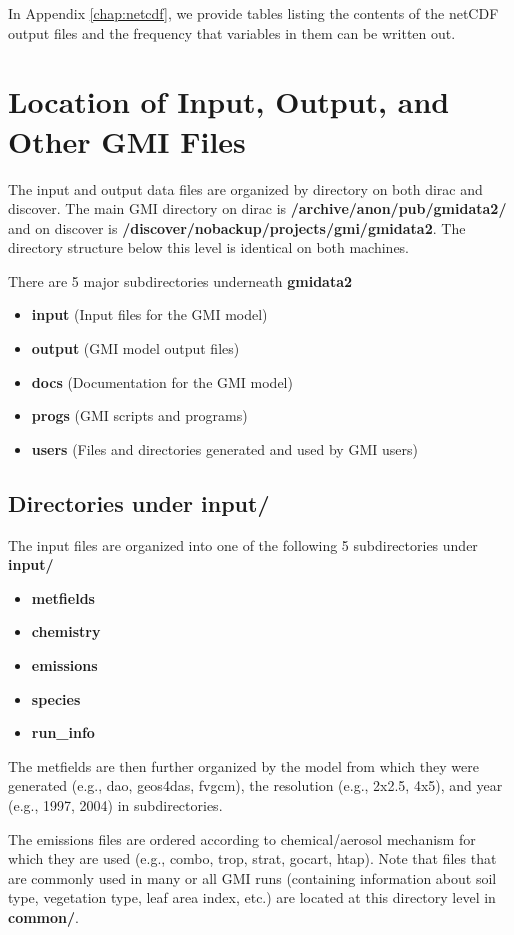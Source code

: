 In Appendix \ref{chap:netcdf}, we provide tables listing the contents of
the netCDF output files and the frequency that variables in them can be written
out.

\section{Location of Input, Output, and Other GMI  Files}
%
The input and output data files are organized by directory on both dirac and discover.  The main GMI directory on dirac is \textbf{/archive/anon/pub/gmidata2/} and on discover is \textbf{/discover/nobackup/projects/gmi/gmidata2}.  The directory structure below this level is identical on both machines.  

There are 5 major subdirectories underneath \textbf{gmidata2}
\begin{itemize}
\item \textbf{input} (Input files for the GMI model)
\item \textbf{output} (GMI model output files)
\item \textbf{docs} (Documentation for the GMI model)
\item \textbf{progs} (GMI scripts and programs)
\item \textbf{users} (Files and directories generated and used by GMI users)
\end{itemize}

\subsection{Directories under input/}
The input files are organized into one of the following 5 subdirectories under \textbf{input/}
\begin{itemize}
\item \textbf{metfields}
\item \textbf{chemistry}
\item \textbf{emissions}
\item \textbf{species}
\item \textbf{run\_info}
\end{itemize}

The metfields are then further organized by the model from which they were generated (e.g., dao, geos4das, fvgcm), the resolution (e.g., 2x2.5, 4x5), and year (e.g., 1997, 2004) in subdirectories.  

The emissions files are ordered according to chemical/aerosol mechanism for which they are used (e.g., combo, trop, strat, gocart, htap).  Note that files that are commonly used in many or all GMI runs (containing information about soil type, vegetation type, leaf area index, etc.) are located at this directory level in \textbf{common/}.

